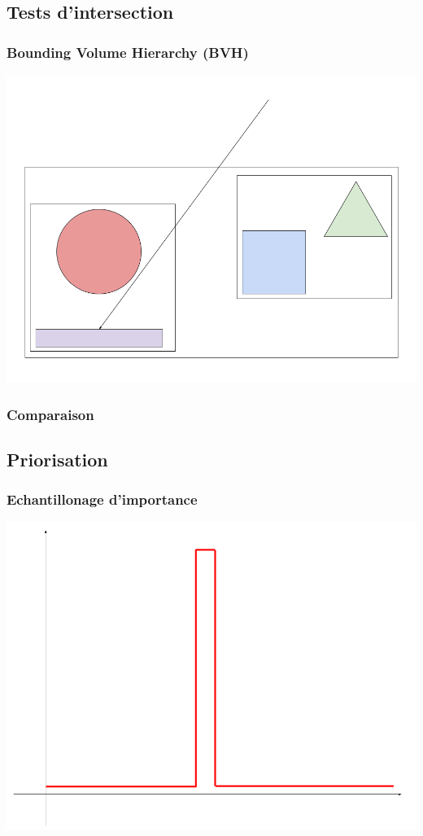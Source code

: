 \documentclass[handout]{beamer}
\begin{document}
\subsection{Tests d'intersection}

\begin{frame}
    \frametitle{Bounding Volume Hierarchy (BVH)}
    \includegraphics[scale=0.3]{Arbre.png}
\end{frame}

\begin{frame}
    \frametitle{Comparaison}
\end{frame}

\subsection{Priorisation}

\begin{frame}
    \frametitle{Echantillonage d'importance}
    \includegraphics[scale=0.3]{Priorisation.png}
\end{frame}
\end{document}
